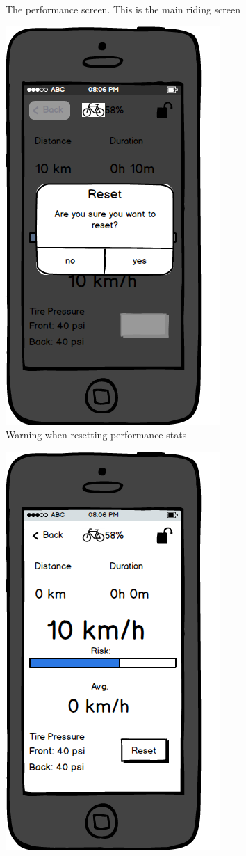 \documentclass[a4paper]{report}
\begin{document}
{\begin{figure}
\caption{The performance screen. This is the main riding screen}
\end{figure}
\clearpage
\begin{figure}
\centering
\includegraphics[scale=0.9]{figures/prototype_2/performance_reset}
\caption{Warning when resetting performance stats}
\end{figure}
\clearpage
\begin{figure}
\centering
\includegraphics[scale=0.9]{figures/prototype_2/performance_resetted}

\end{figure}}
\end{document}
